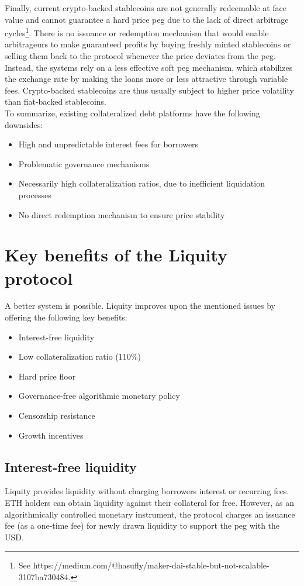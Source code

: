 \documentclass{article}
\begin{document}
Finally, current crypto-backed stablecoins are not generally redeemable at face value and cannot guarantee a hard price peg due to the lack of direct arbitrage cycles\footnote{See https://medium.com/@hasufly/maker-dai-stable-but-not-scalable-3107ba730484.}. There is no issuance or redemption mechanism that would enable arbitrageurs to make guaranteed profits by buying freshly minted stablecoins or selling them back to the protocol whenever the price deviates from the peg. Instead, the systems rely on a less effective soft peg mechanism, which stabilizes the exchange rate by making the loans more or less attractive through variable fees. Crypto-backed stablecoins are thus usually subject to higher price volatility than fiat-backed stablecoins.\\

To summarize, existing collateralized debt platforms have the following downsides:
\begin{itemize}
    \item High and unpredictable interest fees for borrowers
    \item Problematic governance mechanisms
    \item Necessarily high collateralization ratios, due to inefficient liquidation processes
    \item No direct redemption mechanism to ensure price stability
\end{itemize}
 
\section{Key benefits of the Liquity protocol}
A better system is possible. Liquity improves upon the mentioned issues by offering the following key benefits:
\begin{itemize}
    \item Interest-free liquidity
    \item Low collateralization ratio (110\%)
    \item Hard price floor
    \item Governance-free algorithmic monetary policy
    \item Censorship resistance
    \item Growth incentives
\end{itemize}

\subsection{Interest-free liquidity}
Liquity provides liquidity without charging borrowers interest or recurring fees. ETH holders can obtain liquidity against their collateral for free. However, as an algorithmically controlled monetary instrument, the protocol charges an issuance fee (as a one-time fee) for newly drawn liquidity to support the peg with the USD.
\end{document}
